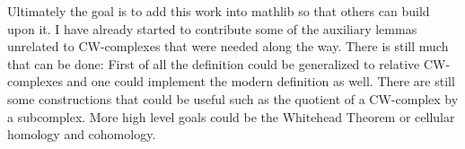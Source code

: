 Ultimately the goal is to add this work into mathlib so that others can build upon it. 
I have already started to contribute some of the auxiliary lemmas unrelated to CW-complexes that were needed along the way. 
There is still much that can be done: 
First of all the definition could be generalized to relative CW-complexes and one could implement the modern definition as well.
There are still some constructions that could be useful such as the quotient of a CW-complex by a subcomplex. 
More high level goals could be the Whitehead Theorem or cellular homology and cohomology. 